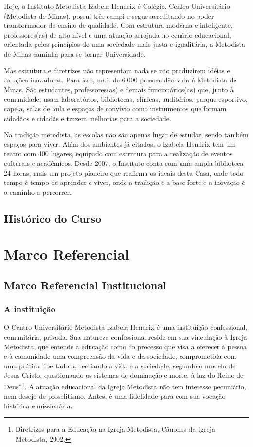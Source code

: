 \documentclass[a4paper, 12pt, openright, oneside, german, french, english, brazil]{abntex2}
\begin{document}
Hoje, o Instituto Metodista Izabela Hendrix é Colégio, Centro Universitário (Metodista de Minas), possui três campi e segue acreditando no poder transformador do ensino de qualidade. Com estrutura moderna e inteligente, professores(as) de alto nível e uma atuação arrojada no cenário educacional, orientada pelos princípios de uma sociedade mais justa e igualitária, a Metodista de Minas caminha para se tornar Universidade.

Mas estrutura e diretrizes não representam nada se não produzirem idéias e soluções inovadoras. Para isso, mais de 6.000 pessoas dão vida à Metodista de Minas. São estudantes, professores(as) e demais funcionários(as) que, junto à comunidade, usam laboratórios, bibliotecas, clínicas, auditórios, parque esportivo, capela, salas de aula e espaços de convívio como instrumentos que formam cidadãos e cidadãs e trazem melhorias para a sociedade.

Na tradição metodista, as escolas não são apenas lugar de estudar, sendo também espaços para viver. Além dos ambientes já citados, o Izabela Hendrix tem um teatro com 400 lugares, equipado com estrutura para a realização de eventos culturais e acadêmicos. Desde 2007, o Instituto conta com uma ampla biblioteca 24 horas, mais um projeto pioneiro que reafirma os ideais desta Casa, onde todo tempo é tempo de aprender e viver, onde a tradição é a base forte e a inovação é o caminho a percorrer.

\section{Histórico do Curso}


\chapter{Marco Referencial}

\section{Marco Referencial Institucional}

\subsection{A instituição}

O Centro Universitário Metodista Izabela Hendrix é uma instituição confessional, comunitária, privada. Sua natureza confessional reside em sua vinculação à Igreja Metodista, que entende a educação como ``o processo que visa a oferecer à pessoa e à comunidade uma compreensão da vida e da sociedade, comprometida com uma prática libertadora, recriando a vida e a sociedade, segundo o modelo de Jesus Cristo, questionando os sistemas de dominação e morte, à luz do Reino de Deus''\footnote{Diretrizes para a Educação na Igreja Metodista, Cânones da Igreja Metodista, 2002.}. A atuação educacional da Igreja Metodista não tem interesse pecuniário, nem desejo de proselitismo. Antes, é uma fidelidade para com sua vocação histórica e missionária.
\end{document}

